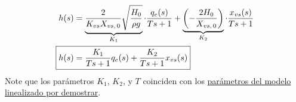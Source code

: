 \begin{align*}
    h (s) &= \underbrace{\frac{2}{K _{vs} X _{vs,\,0}} \sqrt{ \frac{H _{0}}{ \rho g}}}_{K_1} \cdot \frac{q _{e} (s)}{Ts + 1} + \underbrace{\left( -\frac{2H _{0}}{X _{vs,\,0}} \right)}_{K_2} \cdot \frac{x _{vs} (s)}{Ts + 1}\\
    \Aboxed{h (s) &= \frac{K_1}{Ts +1 } q _{e} (s) + \frac{K_2}{Ts + 1} x _{vs}(s)}
\end{align*}
Note que los parámetros $K_1$, $K_2$, y $T$ coinciden con los \hyperref[eq3]{parámetros del modelo linealizado por demostrar}.
